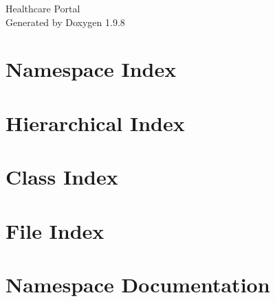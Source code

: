 \documentclass[twoside]{book}
\newcommand{\+}{\discretionary{\mbox{\scriptsize$\hookleftarrow$}}{}{}}
\newcommand{\clearemptydoublepage}{%
    \newpage{\pagestyle{empty}\cleardoublepage}%
  }
\begin{document}
  \raggedbottom
    \hypersetup{pageanchor=false,
                bookmarksnumbered=true,
                pdfencoding=unicode
               }
  \begin{titlepage}
  \vspace*{7cm}
  \begin{center}%
  {\Large Healthcare Portal}\\
  \vspace*{1cm}
  {\large Generated by Doxygen 1.9.8}\\
  \end{center}
  \end{titlepage}
  \clearemptydoublepage
  \tableofcontents
  \clearemptydoublepage
  \hypersetup{pageanchor=true}

\chapter{Namespace Index}

\chapter{Hierarchical Index}

\chapter{Class Index}

\chapter{File Index}

\chapter{Namespace Documentation}












\end{document}
